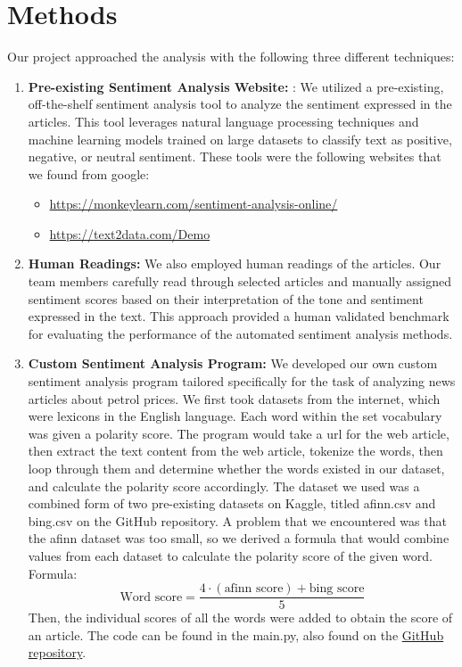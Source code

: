 \documentclass{report}
\begin{document}
\section{Methods}
Our project approached the analysis with the following three different
techniques:
\begin{enumerate}
    \item \textbf{Pre-existing Sentiment Analysis Website:} : We utilized a pre-existing,
          off-the-shelf sentiment analysis tool to analyze the sentiment expressed
          in the articles. This tool leverages natural language processing
          techniques and machine learning models trained on large datasets to
          classify text as positive, negative, or neutral sentiment. These tools were
          the following websites that we found from google:
          \begin{itemize}
              \item \href{https://monkeylearn.com/sentiment-analysis-online/}{https://monkeylearn.com/sentiment-analysis-online/}
              \item \href{          https://text2data.com/Demo
                    }{          https://text2data.com/Demo
                    }
          \end{itemize}
    \item \textbf{Human Readings:} We also employed human readings of the articles. Our team members carefully read through selected articles and manually
          assigned sentiment scores based on their interpretation of the tone and
          sentiment expressed in the text. This approach provided a human validated benchmark for evaluating the performance of the automated
          sentiment analysis methods.
    \item \textbf{Custom Sentiment Analysis Program:}  We developed our own custom
          sentiment analysis program tailored specifically for the task of analyzing
          news articles about petrol prices. We first took datasets from the internet,
          which were lexicons in the English language. Each word within the set
          vocabulary was given a polarity score. The program would take a url for
          the web article, then extract the text content from the web article,
          tokenize the words, then loop through them and determine whether the
          words existed in our dataset, and calculate the polarity score
          accordingly. The dataset we used was a combined form of two pre-existing datasets on Kaggle, titled afinn.csv and bing.csv on the GitHub
          repository. A problem that we encountered was that the afinn dataset
          was too small, so we derived a formula that would combine values from
          each dataset to calculate the polarity score of the given word. Formula:
          \begin{equation}
              \text{Word score} = \frac{4 \cdot (\text{afinn score}) + \text{bing score}}{5}
          \end{equation}
          Then, the individual scores
          of all the words were added to obtain the score of an article. The code
          can be found in the main.py, also found on the \href{https://github.com/NehalNN10/TNTStrike/}{GitHub repository}.
\end{enumerate}
\end{document}
